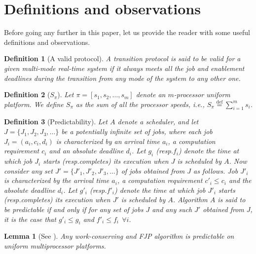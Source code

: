 \documentclass[10pt,english,a4paper]{article}
\newcommand{\equals}{\stackrel{\mathrm{def}}{=}}
\newtheorem{lemma}{Lemma}
\newtheorem{definition}{\bf Definition}
\newtheorem{validity test}{Validity Test}
\begin{document}
\section{Definitions and observations}
\label{Definitions and observations}

Before going any further in this paper, let us provide the reader with some useful definitions and observations. 

\begin{definition}[A valid protocol] 
A transition protocol is said to be {\em valid} for a given multi-mode real-time system if it always meets all the job and enablement deadlines during the transition from any mode of the system to any other one.  
\end{definition}

\begin{definition}[$S_{\pi}$]
Let $\pi = [s_1, s_2, \ldots, s_m]$ denote an $m$-processor uniform platform. We define $S_{\pi}$ as the sum of all the processor speeds, i.e., $S_{\pi} \equals \sum_{i=1}^{m} s_i$.
\end{definition}

\begin{definition}[Predictability]
Let $A$ denote a scheduler, and let $J = \{J_1, J_2, J_3, \ldots\}$ be a potentially infinite set of jobs, where each job $J_i = (a_i, c_i, d_i)$ is characterized by an arrival time $a_i$, a computation requirement $c_i$ and an absolute deadline $d_i$. Let $g_i$ (resp.\@\:$f_i$) denote the time at which job $J_i$ starts (resp.\@\:completes) its execution when $J$ is scheduled by $A$. Now consider any set $J'= \{J'_1, J'_2, J'_3, \ldots\}$ of jobs obtained from $J$ as follows. Job $J'_i$ is characterized by the arrival time $a_i$, a computation requirement $c'_i \le c_i$ and the absolute deadline $d_i$. Let $g'_i$ (resp.\@\:$f'_i$) denote the time at which job $J'_i$ starts (resp.\@\:completes) its execution when $J'$ is scheduled by $A$. Algorithm $A$ is said to be {\em predictable} if and only if for any set of jobs $J$ and any such $J'$ obtained from $J$, it is the case that $g'_i \le g_i$ and $f'_i \le f_i \:\: \forall i$. 
\end{definition}

\begin{lemma}[See \cite{CucuJo4}]\label{predict} 
Any work-conserving and FJP algorithm is predictable on uniform multiprocessor platforms. 
\end{lemma}
\end{document}
